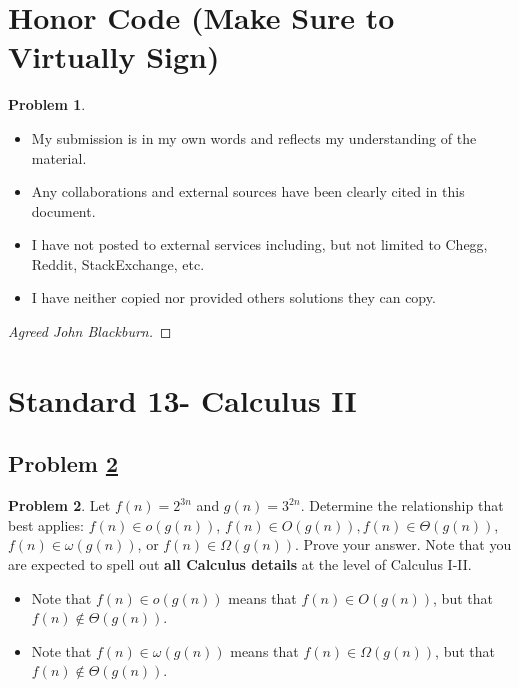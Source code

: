 \documentclass[11pt]{article}
\theoremstyle{definition}
\theoremstyle{definition}
\newtheorem{required}{Problem}
\theoremstyle{definition}
\begin{document}
\section{Honor Code (Make Sure to Virtually Sign)} \label{HonorCode}

\begin{required}
\begin{itemize}
\item My submission is in my own words and reflects my understanding of the material.
\item Any collaborations and external sources have been clearly cited in this document.
\item I have not posted to external services including, but not limited to Chegg, Reddit, StackExchange, etc.
\item I have neither copied nor provided others solutions they can copy.
\end{itemize}

\end{required}

\begin{proof}[Agreed John Blackburn]
\end{proof}


\newpage
\section{Standard 13- Calculus II}

\subsection{Problem \ref{Safe1}}
\begin{required} \label{Safe1}
Let $f(n) =2^{3n}$ and $g(n) = 3^{2n}$. Determine the relationship that best applies: $f(n) \in o(g(n))$, $f(n) \in O(g(n)), f(n) \in \Theta(g(n))$, $f(n) \in \omega(g(n))$, or $f(n) \in \Omega(g(n))$. Prove your answer. Note that you are expected to spell out \textbf{all Calculus details} at the level of Calculus I-II.
\begin{itemize}
\item Note that $f(n) \in o(g(n))$ means that $f(n) \in O(g(n))$, but that $f(n) \not \in \Theta(g(n))$.
\item Note that $f(n) \in \omega(g(n))$ means that $f(n) \in \Omega(g(n))$, but that $f(n) \not \in \Theta(g(n))$.
\end{itemize}
\end{required}
\end{document}
